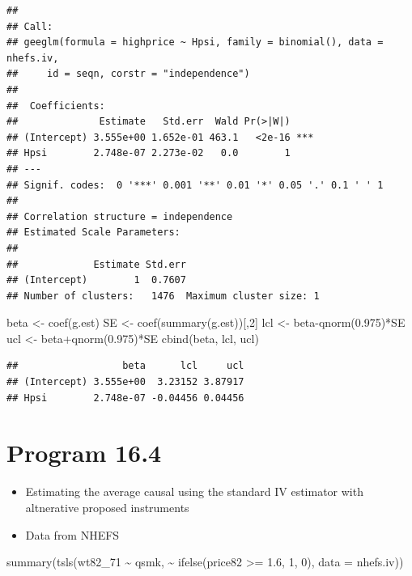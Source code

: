 \documentclass[
  10pt,
]{book}
\newenvironment{Shaded}{\begin{snugshade}}{\end{snugshade}}
\newcommand{\AttributeTok}[1]{\textcolor[rgb]{0.77,0.63,0.00}{#1}}
\newcommand{\DecValTok}[1]{\textcolor[rgb]{0.00,0.00,0.81}{#1}}
\newcommand{\FloatTok}[1]{\textcolor[rgb]{0.00,0.00,0.81}{#1}}
\newcommand{\FunctionTok}[1]{\textcolor[rgb]{0.00,0.00,0.00}{#1}}
\newcommand{\NormalTok}[1]{#1}
\newcommand{\OtherTok}[1]{\textcolor[rgb]{0.56,0.35,0.01}{#1}}
\newcommand{\SpecialCharTok}[1]{\textcolor[rgb]{0.00,0.00,0.00}{#1}}
\providecommand{\tightlist}{%
  \setlength{\itemsep}{0pt}\setlength{\parskip}{0pt}}
\begin{document}
\begin{verbatim}
## 
## Call:
## geeglm(formula = highprice ~ Hpsi, family = binomial(), data = nhefs.iv, 
##     id = seqn, corstr = "independence")
## 
##  Coefficients:
##              Estimate   Std.err  Wald Pr(>|W|)    
## (Intercept) 3.555e+00 1.652e-01 463.1   <2e-16 ***
## Hpsi        2.748e-07 2.273e-02   0.0        1    
## ---
## Signif. codes:  0 '***' 0.001 '**' 0.01 '*' 0.05 '.' 0.1 ' ' 1
## 
## Correlation structure = independence 
## Estimated Scale Parameters:
## 
##             Estimate Std.err
## (Intercept)        1  0.7607
## Number of clusters:   1476  Maximum cluster size: 1
\end{verbatim}

\begin{Shaded}
\begin{Highlighting}[]
\NormalTok{beta }\OtherTok{\textless{}{-}} \FunctionTok{coef}\NormalTok{(g.est)}
\NormalTok{SE }\OtherTok{\textless{}{-}} \FunctionTok{coef}\NormalTok{(}\FunctionTok{summary}\NormalTok{(g.est))[,}\DecValTok{2}\NormalTok{]}
\NormalTok{lcl }\OtherTok{\textless{}{-}}\NormalTok{ beta}\SpecialCharTok{{-}}\FunctionTok{qnorm}\NormalTok{(}\FloatTok{0.975}\NormalTok{)}\SpecialCharTok{*}\NormalTok{SE }
\NormalTok{ucl }\OtherTok{\textless{}{-}}\NormalTok{ beta}\SpecialCharTok{+}\FunctionTok{qnorm}\NormalTok{(}\FloatTok{0.975}\NormalTok{)}\SpecialCharTok{*}\NormalTok{SE}
\FunctionTok{cbind}\NormalTok{(beta, lcl, ucl)}
\end{Highlighting}
\end{Shaded}

\begin{verbatim}
##                  beta      lcl     ucl
## (Intercept) 3.555e+00  3.23152 3.87917
## Hpsi        2.748e-07 -0.04456 0.04456
\end{verbatim}

\hypertarget{program-16.4}{%
\section{Program 16.4}\label{program-16.4}}

\begin{itemize}
\tightlist
\item
  Estimating the average causal using the standard IV estimator with altnerative proposed instruments
\item
  Data from NHEFS
\end{itemize}

\begin{Shaded}
\begin{Highlighting}[]
\FunctionTok{summary}\NormalTok{(}\FunctionTok{tsls}\NormalTok{(wt82\_71 }\SpecialCharTok{\textasciitilde{}}\NormalTok{ qsmk, }\SpecialCharTok{\textasciitilde{}} \FunctionTok{ifelse}\NormalTok{(price82 }\SpecialCharTok{\textgreater{}=} \FloatTok{1.6}\NormalTok{, }\DecValTok{1}\NormalTok{, }\DecValTok{0}\NormalTok{), }\AttributeTok{data =}\NormalTok{ nhefs.iv))}
\end{Highlighting}
\end{Shaded}
\end{document}
